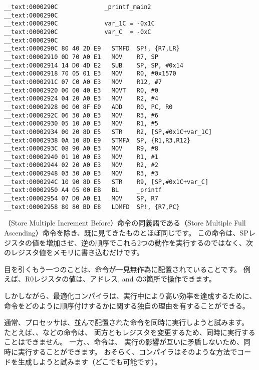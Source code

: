 \begin{lstlisting}[style=customasmARM]
__text:0000290C             _printf_main2
__text:0000290C
__text:0000290C             var_1C = -0x1C
__text:0000290C             var_C  = -0xC
__text:0000290C
__text:0000290C 80 40 2D E9   STMFD  SP!, {R7,LR}
__text:00002910 0D 70 A0 E1   MOV    R7, SP
__text:00002914 14 D0 4D E2   SUB    SP, SP, #0x14
__text:00002918 70 05 01 E3   MOV    R0, #0x1570
__text:0000291C 07 C0 A0 E3   MOV    R12, #7
__text:00002920 00 00 40 E3   MOVT   R0, #0
__text:00002924 04 20 A0 E3   MOV    R2, #4
__text:00002928 00 00 8F E0   ADD    R0, PC, R0
__text:0000292C 06 30 A0 E3   MOV    R3, #6
__text:00002930 05 10 A0 E3   MOV    R1, #5
__text:00002934 00 20 8D E5   STR    R2, [SP,#0x1C+var_1C]
__text:00002938 0A 10 8D E9   STMFA  SP, {R1,R3,R12}
__text:0000293C 08 90 A0 E3   MOV    R9, #8
__text:00002940 01 10 A0 E3   MOV    R1, #1
__text:00002944 02 20 A0 E3   MOV    R2, #2
__text:00002948 03 30 A0 E3   MOV    R3, #3
__text:0000294C 10 90 8D E5   STR    R9, [SP,#0x1C+var_C]
__text:00002950 A4 05 00 EB   BL     _printf
__text:00002954 07 D0 A0 E1   MOV    SP, R7
__text:00002958 80 80 BD E8   LDMFD  SP!, {R7,PC}
\end{lstlisting}

（Store Multiple Increment Before）命令の同義語である（Store Multiple Full Ascending）命令を除き、既に見てきたものとほぼ同じです。
この命令は、\ac{SP}レジスタの値を増加させ、逆の順序でこれら2つの動作を実行するのではなく、次のレジスタ値をメモリに書き込むだけです。

目を引くもう一つのことは、命令が一見無作為に配置されていることです。
例えば、R0レジスタの値は、アドレス,  and の3箇所で操作できます。

しかしながら、最適化コンパイラは、実行中により高い効率を達成するために、命令をどのように順序付けするかに関する独自の理由を有することができる。

通常、プロセッサは、並んで配置された命令を同時に実行しようと試みます。
たとえば、、などの命令は、
両方ともレジスタを変更するため、同時に実行することはできません。
一方、、命令は、
実行の影響が互いに矛盾しないため、同時に実行することができます。
おそらく、コンパイラはそのような方法でコードを生成しようと試みます（どこでも可能です）。

\myparagraph{\OptimizingXcodeIV: \ThumbTwoMode}

